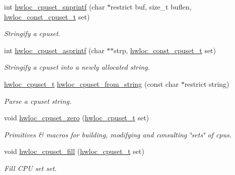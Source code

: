 \begin{DoxyCompactItemize}
int \hyperlink{group__hwlocality__cpuset_gae60387d479de85cd556ce5faa8f0894e}{hwloc\_\-cpuset\_\-snprintf} (char $\ast$restrict buf, size\_\-t buflen, \hyperlink{group__hwlocality__cpuset_gad2f7833583d020af31e01554251dbe11}{hwloc\_\-const\_\-cpuset\_\-t} set)
\begin{DoxyCompactList}\small\item\em Stringify a cpuset. \item\end{DoxyCompactList}\item 
int \hyperlink{group__hwlocality__cpuset_ga29160016d2e89318b5db99046d93dc0a}{hwloc\_\-cpuset\_\-asprintf} (char $\ast$$\ast$strp, \hyperlink{group__hwlocality__cpuset_gad2f7833583d020af31e01554251dbe11}{hwloc\_\-const\_\-cpuset\_\-t} set)
\begin{DoxyCompactList}\small\item\em Stringify a cpuset into a newly allocated string. \item\end{DoxyCompactList}\item 
\hyperlink{group__hwlocality__cpuset_ga7366332f7090f5b54d4b25a0c2c4b411}{hwloc\_\-cpuset\_\-t} \hyperlink{group__hwlocality__cpuset_ga63e62db35640c1b90684952d7a3b5175}{hwloc\_\-cpuset\_\-from\_\-string} (const char $\ast$restrict string)
\begin{DoxyCompactList}\small\item\em Parse a cpuset string. \item\end{DoxyCompactList}\item 
void \hyperlink{group__hwlocality__cpuset_ga4d63507128a35e6eda3fa6104970ac99}{hwloc\_\-cpuset\_\-zero} (\hyperlink{group__hwlocality__cpuset_ga7366332f7090f5b54d4b25a0c2c4b411}{hwloc\_\-cpuset\_\-t} set)
\begin{DoxyCompactList}\small\item\em Primitives \& macros for building, modifying and consulting \char`\"{}sets\char`\"{} of cpus. \item\end{DoxyCompactList}\item 
void \hyperlink{group__hwlocality__cpuset_gad1a6c02ae378aff412c2b843cf8cc3f4}{hwloc\_\-cpuset\_\-fill} (\hyperlink{group__hwlocality__cpuset_ga7366332f7090f5b54d4b25a0c2c4b411}{hwloc\_\-cpuset\_\-t} set)
\begin{DoxyCompactList}\small\item\em Fill CPU set {\ttfamily set}. \item\end{DoxyCompactList}\item 
$$
\end{DoxyCompactItemize}
